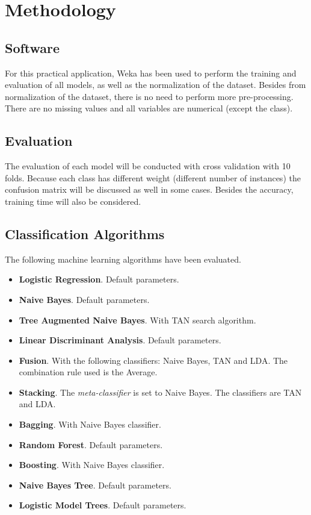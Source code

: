 \documentclass[a4paper,11pt]{article}
\begin{document}
\section{Methodology}
\label{sec:methodology}

\subsection{Software}
\label{subsec:software}

For this practical application, Weka \cite{weka} has been used to perform the training and evaluation of all models, as well as the normalization of the dataset. Besides from normalization of the dataset, there is no need to perform more pre-processing. There are no missing values and all variables are numerical (except the class).

\subsection{Evaluation}
\label{subsec:evaluation}

The evaluation of each model will be conducted with cross validation with 10 folds. Because each class has different weight (different number of instances) the confusion matrix will be discussed as well in some cases. Besides the accuracy, training time will also be considered.

\subsection{Classification Algorithms}
\label{subsec:algorithms}

The following machine learning algorithms have been evaluated.

\begin{itemize}
\item \textbf{Logistic Regression}. Default parameters.
\item \textbf{Naive Bayes}. Default parameters.
\item \textbf{Tree Augmented Naive Bayes}. With TAN search algorithm.
\item \textbf{Linear Discriminant Analysis}. Default parameters.
\item \textbf{Fusion}. With the following classifiers: Naive Bayes, TAN and LDA. The combination rule used is the Average.
\item \textbf{Stacking}. The \textit{meta-classifier} is set to Naive Bayes. The classifiers are TAN and LDA.
\item \textbf{Bagging}. With Naive Bayes classifier.
\item \textbf{Random Forest}. Default parameters.
\item \textbf{Boosting}. With Naive Bayes classifier.
\item \textbf{Naive Bayes Tree}. Default parameters.
\item \textbf{Logistic Model Trees}. Default parameters.
\end{itemize}
\end{document}
